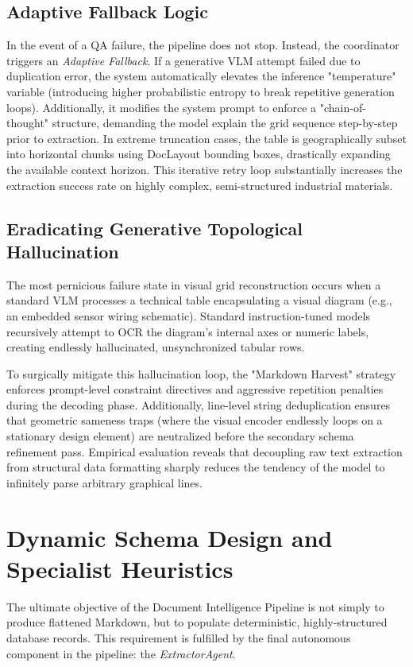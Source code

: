 \subsection{Adaptive Fallback Logic}
In the event of a QA failure, the pipeline does not stop. Instead, the coordinator triggers an \textit{Adaptive Fallback}. If a generative VLM attempt failed due to duplication error, the system automatically elevates the inference "temperature" variable (introducing higher probabilistic entropy to break repetitive generation loops). Additionally, it modifies the system prompt to enforce a "chain-of-thought" structure, demanding the model explain the grid sequence step-by-step prior to extraction. In extreme truncation cases, the table is geographically subset into horizontal chunks using DocLayout bounding boxes, drastically expanding the available context horizon. This iterative retry loop substantially increases the extraction success rate on highly complex, semi-structured industrial materials.

\subsection{Eradicating Generative Topological Hallucination}
The most pernicious failure state in visual grid reconstruction occurs when a standard VLM processes a technical table encapsulating a visual diagram (e.g., an embedded sensor wiring schematic). Standard instruction-tuned models recursively attempt to OCR the diagram's internal axes or numeric labels, creating endlessly hallucinated, unsynchronized tabular rows. 

To surgically mitigate this hallucination loop, the "Markdown Harvest" strategy enforces prompt-level constraint directives and aggressive repetition penalties during the decoding phase. Additionally, line-level string deduplication ensures that geometric sameness traps (where the visual encoder endlessly loops on a stationary design element) are neutralized before the secondary schema refinement pass. Empirical evaluation reveals that decoupling raw text extraction from structural data formatting sharply reduces the tendency of the model to infinitely parse arbitrary graphical lines.

\section{Dynamic Schema Design and Specialist Heuristics}
\label{sec:schema_design}

The ultimate objective of the Document Intelligence Pipeline is not simply to produce flattened Markdown, but to populate deterministic, highly-structured database records. This requirement is fulfilled by the final autonomous component in the pipeline: the \textit{ExtractorAgent}.

